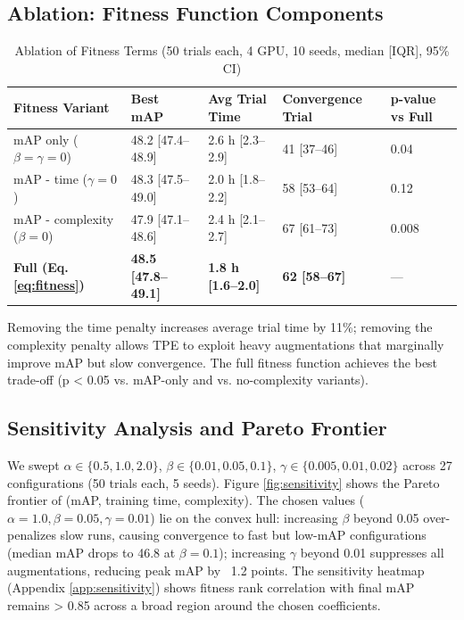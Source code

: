 \documentclass[10pt,twocolumn,letterpaper]{article}
\begin{document}
\subsection{Ablation: Fitness Function Components}
\begin{table}[htbp]
\centering
\caption{Ablation of Fitness Terms (50 trials each, 4 GPU, 10 seeds, median [IQR], 95\% CI)}
\label{tab:ablation_fitness}
\begin{tabular}{@{}lllll@{}}
\toprule
Fitness Variant & Best mAP & Avg Trial Time & Convergence Trial & p-value vs Full \\ \midrule
mAP only ($\beta=\gamma=0$) & 48.2 [47.4--48.9] & 2.6 h [2.3--2.9] & 41 [37--46] & 0.04 \\
mAP - time ($\gamma=0$) & 48.3 [47.5--49.0] & 2.0 h [1.8--2.2] & 58 [53--64] & 0.12 \\
mAP - complexity ($\beta=0$) & 47.9 [47.1--48.6] & 2.4 h [2.1--2.7] & 67 [61--73] & 0.008 \\
\textbf{Full (Eq. \ref{eq:fitness})} & \textbf{48.5 [47.8--49.1]} & \textbf{1.8 h [1.6--2.0]} & \textbf{62 [58--67]} & --- \\ \bottomrule
\end{tabular}
\end{table}

Removing the time penalty increases average trial time by 11\%; removing the complexity penalty allows TPE to exploit heavy augmentations that marginally improve mAP but slow convergence. The full fitness function achieves the best trade-off (p < 0.05 vs. mAP-only and vs. no-complexity variants).

\subsection{Sensitivity Analysis and Pareto Frontier}
We swept $\alpha \in \{0.5, 1.0, 2.0\}$, $\beta \in \{0.01, 0.05, 0.1\}$, $\gamma \in \{0.005, 0.01, 0.02\}$ across 27 configurations (50 trials each, 5 seeds). Figure \ref{fig:sensitivity} shows the Pareto frontier of (mAP, training time, complexity). The chosen values ($\alpha=1.0, \beta=0.05, \gamma=0.01$) lie on the convex hull: increasing $\beta$ beyond 0.05 over-penalizes slow runs, causing convergence to fast but low-mAP configurations (median mAP drops to 46.8 at $\beta=0.1$); increasing $\gamma$ beyond 0.01 suppresses all augmentations, reducing peak mAP by ~1.2 points. The sensitivity heatmap (Appendix \ref{app:sensitivity}) shows fitness rank correlation with final mAP remains > 0.85 across a broad region around the chosen coefficients.
\end{document}
